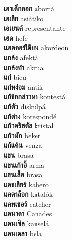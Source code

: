 \textbf{ เอาเด็กออก  } abortá \\
\textbf{ เอเชีย  } asiátiko \\
\textbf{ เอเยนต์  } representante \\
\textbf{ เฮด  } hefe \\
\textbf{ เเอคคอร์เีดียน  } akordeon \\
\textbf{ แกล้ง  } afektá \\
\textbf{ แกล้งทำ  } aktua \\
\textbf{ แก่  } bieu \\
\textbf{ แก่หง่อม  } antik \\
\textbf{ แก้ข้อกล่าวหา  } kontestá \\
\textbf{ แก้ตัว  } diskulpá \\
\textbf{ แก้ต่าง  } korespondé \\
\textbf{ แก้วคริสตัล  } kristal \\
\textbf{ แก้วมัก  } beker \\
\textbf{ แก้แค้น  } venga \\
\textbf{ แขน  } brasa \\
\textbf{ แขนเก้าอี้  } arma \\
\textbf{ แขนเสื้อ  } brasa \\
\textbf{ แคชเชียร์  } kahero \\
\textbf{ แคตาล็อก  } katalòk \\
\textbf{ แคทเชอร์  } catcher \\
\textbf{ แคนาดา  } Canades \\
\textbf{ แคนเซิล  } kanselá \\
\textbf{ แคนเดลา  } bela \\
